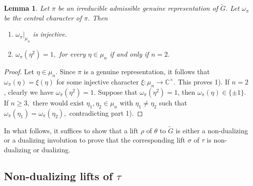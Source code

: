 \documentclass[11pt, a4paper, reqno]{amsart}
\newtheorem{lemma}[theorem]{Lemma}
\theoremstyle{definition}
\theoremstyle{remark}
\theoremstyle{example}
\theoremstyle{note}
\numberwithin{equation}{section}
\begin{document}
\begin{lemma}\label{restriction-mu-n-of-central-character-injective}
	Let $\pi$ be an irreducible admissible genuine representation of $\widetilde{G}.$ Let $\omega_\pi$ be the central character of $\pi.$ Then
	\begin{enumerate}[label=\emph{\arabic*)}]
		\item ${\omega_\pi}\big |_{\mu_n}$ is injective.
		\smallskip
		
		\item $\omega_\pi(\eta^2) = 1,$ for every $\eta\in \mu_n$ if and only if $n=2.$
	\end{enumerate}
\end{lemma}

\begin{proof} Let $\eta\in \mu_n$. Since $\pi$ is a genuine representation,  it follows that $ \omega_\pi(\eta) = \xi(\eta)$ for some injective character $\xi: \mu_n \to \mathbb{C}^\times.$ This proves 1).  If $n=2$, clearly we have $\omega_\pi(\eta^2) = 1.$ Suppose that $\omega_\pi(\eta^2) = 1$, then $\omega_\pi(\eta) \in \{\pm 1\}.$  If $n \geq 3,$ there would exist $\eta_{1}, \eta_{2} \in \mu_{n}$ with $\eta_{1} \neq \eta_{2}$ such that $\omega_{\pi}(\eta_{1}) = \omega_\pi(\eta_{2}),$ contradicting part 1). 
\end{proof}


In what follows, it suffices to show that a lift $\rho$ of $\theta$ to $\widetilde{G}$ is either a non-dualizing or a dualizing involution to prove that the corresponding lift $\sigma$ of $\tau$ is non-dualizing or dualizing.


\subsection{Non-dualizing lifts of $\tau$} \label{Non-dualizing lifts of tau}
\end{document}
